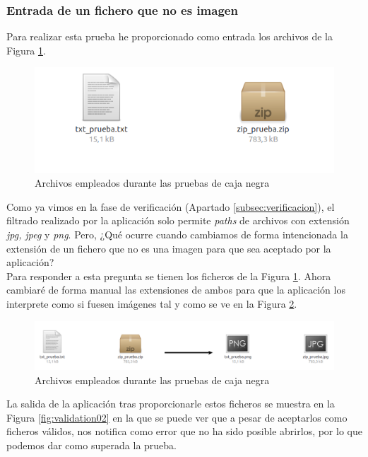 \documentclass[a4paper,11pt]{book}
\begin{document}
\subsubsection{Entrada de un fichero que no es imagen}
Para realizar esta prueba he proporcionado como entrada los archivos de la Figura \ref{fig:archivosValidacion}.\\

\begin{figure}[h]
\centering
\includegraphics[width=0.7\linewidth]{imagenes/archivosValidacion}
\caption[Archivos originales]{Archivos empleados durante las pruebas de caja negra}
\label{fig:archivosValidacion}
\end{figure}

Como ya vimos en la fase de verificación (Apartado \ref{subsec:verificacion}), el filtrado realizado por la aplicación solo permite \textit{paths} de archivos con extensión \textit{jpg, jpeg} y \textit{png}. Pero, ¿Qué ocurre cuando cambiamos de forma intencionada la extensión de un fichero que no es una imagen para que sea aceptado por la aplicación?\\
Para responder a esta pregunta se tienen los ficheros de la Figura \ref{fig:archivosValidacion}. Ahora cambiaré de forma manual las extensiones de ambos para que la aplicación los interprete como si fuesen imágenes tal y como se ve en la Figura \ref{fig:archivosValidacion01}.

\begin{figure}[!h]
	\centering
	\includegraphics[width=0.9\linewidth]{imagenes/archivosValidacion01}
	\caption[Archivos de validacion]{Archivos empleados durante las pruebas de caja negra}
	\label{fig:archivosValidacion01}
\end{figure}

La salida de la aplicación tras proporcionarle estos ficheros se muestra en la Figura \ref{fig:validation02} en la que se puede ver que a pesar de aceptarlos como ficheros válidos, nos notifica como error que no ha sido posible abrirlos, por lo que podemos dar como superada la prueba.\\
\end{document}
